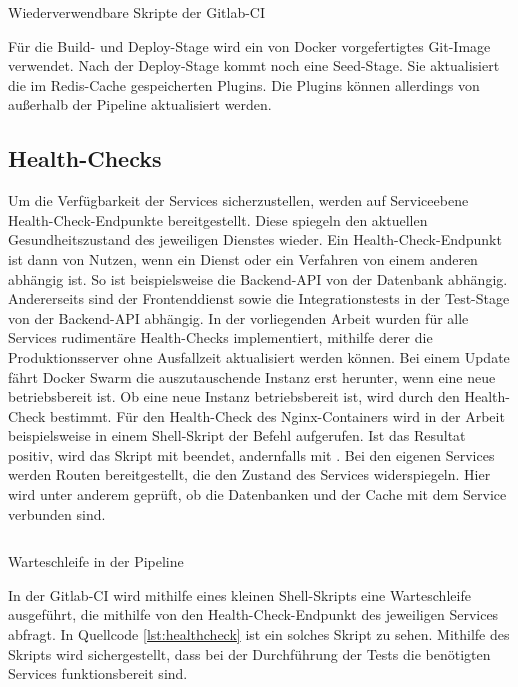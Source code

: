 \begin{listing}
    \inputminted{yaml}{snippets/yml/reusable_scripts.yml}
    \caption{Wiederverwendbare Skripte der Gitlab-CI}
    \label{lst:wiederverwendbarescriptsdergitlabci}
\end{listing}

Für die Build- und Deploy-Stage wird ein von Docker vorgefertigtes Git-Image verwendet. Nach der Deploy-Stage
kommt noch eine Seed-Stage. Sie aktualisiert die im Redis-Cache gespeicherten Plugins. Die Plugins können
allerdings von außerhalb der Pipeline aktualisiert werden.

\subsection{Health-Checks}
\label{subsec:healthcheck}
Um die Verfügbarkeit der Services sicherzustellen, werden auf
Serviceebene Health-Check-Endpunkte bereitgestellt. Diese spiegeln den aktuellen
Gesundheitszustand des jeweiligen Dienstes wieder. Ein Health-Check-Endpunkt
ist dann von Nutzen, wenn ein Dienst oder ein Verfahren von einem anderen
abhängig ist. So ist beispielsweise die Backend-API von der Datenbank
abhängig. Andererseits sind der Frontenddienst sowie die Integrationstests
in der Test-Stage von der Backend-API abhängig. In der vorliegenden Arbeit wurden für alle Services
rudimentäre Health-Checks implementiert, mithilfe derer die Produktionsserver ohne Ausfallzeit
aktualisiert werden können. Bei einem Update fährt Docker Swarm die auszutauschende
Instanz erst herunter, wenn eine neue betriebsbereit ist. Ob eine neue Instanz betriebsbereit ist,
wird durch den Health-Check bestimmt. Für den Health-Check des Nginx-Containers wird in der Arbeit beispielsweise
in einem Shell-Skript der Befehl  aufgerufen. Ist das Resultat positiv, wird
das Skript mit  beendet, andernfalls mit . Bei den eigenen Services werden 
Routen bereitgestellt, die den Zustand des Services widerspiegeln. Hier wird unter anderem geprüft, ob die Datenbanken
und der Cache mit dem Service verbunden sind.

\begin{listing}
    \inputminted{sh}{snippets/sh/healthcheck.sh}
    \caption{Warteschleife in der Pipeline}
    \label{lst:healthcheck}
\end{listing}

In der Gitlab-CI wird mithilfe eines kleinen Shell-Skripts eine Warteschleife ausgeführt, die mithilfe von
 den Health-Check-Endpunkt des jeweiligen Services abfragt. In Quellcode \ref{lst:healthcheck}
ist ein solches Skript zu sehen. Mithilfe des Skripts wird sichergestellt, dass bei der Durchführung
der Tests die benötigten Services funktionsbereit sind.

